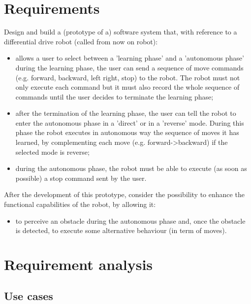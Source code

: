\documentclass{llncs}
\newcommand{\labelsec}[1]{\label{sec:#1}}
\newcommand{\labelssec}[1]{\label{ssec:#1}}
\begin{document}
\section{Requirements}
\labelsec{Requirements}
Design and build a (prototype of a) software system that, with reference to a differential drive robot (called from now on robot):
\begin{itemize}
	\item allows a user to select between a 'learning phase' and a 'autonomous phase'
    during the learning phase, the user can send a sequence of move commands (e.g. forward, backward, left right, stop) to the robot. The robot must not only execute each command but it must also record the whole sequence of commands until the user decides to terminate the learning phase;
    \item after the termination of the learning phase, the user can tell the robot to enter the autonomous phase in a 'direct' or in a 'reverse' mode. During this phase the robot executes in autonomous way the sequence of moves it has learned, by complementing each move (e.g. forward->backward) if the selected mode is reverse;
    \item during the autonomous phase, the robot must be able to execute (as soon as possible) a stop command sent by the user.
\end{itemize}
After the development of this prototype, consider the possibility to enhance the functional capabilities of the robot, by allowing it:
\begin{itemize}
	\item to perceive an obstacle during the autonomous phase and, once the obstacle is detected, to execute some alternative behaviour (in term of moves).
\end{itemize}


 
\section{Requirement analysis}
\labelsec{ReqAnalysis}
\subsection{Use cases}
\labelssec{UseCases}
\end{document}
